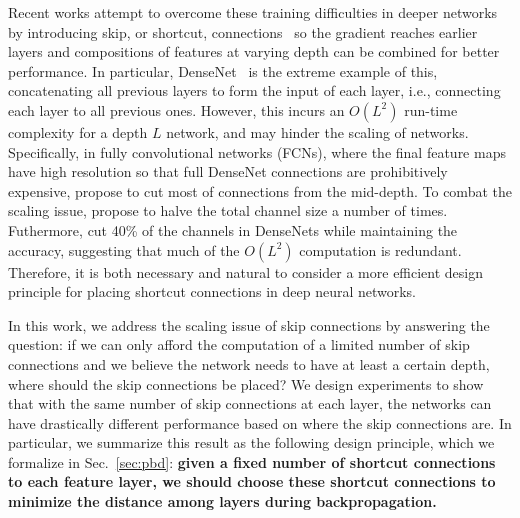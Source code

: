 \documentclass{article}
\begin{document}
Recent works attempt to overcome these training difficulties in deeper networks by introducing skip, or shortcut, connections~\citep{fcn, hypercolumn, highwaynet, resnet, fractalnet, densenet} so the gradient reaches earlier layers and compositions of features at varying depth can be combined for better performance. In particular, DenseNet~\citep{densenet} is the extreme example of this, concatenating all previous layers to form the input of each layer, i.e., connecting each layer to all previous ones. However, this incurs an $O(L^2)$ run-time complexity for a depth $L$ network, and may hinder the scaling of networks. Specifically, in fully convolutional networks (FCNs), where the final feature maps have high resolution so that full DenseNet connections are prohibitively expensive, \cite{fcdense} propose to cut most of connections from the mid-depth. To combat the scaling issue, \cite{densenet} propose to halve the total channel size a number of times. Futhermore, \cite{slim_nn} cut 40\% of the channels in DenseNets while maintaining the accuracy, suggesting that much of the $O(L^2)$ computation is redundant. Therefore, it is both necessary and natural to consider a more efficient design principle for placing shortcut connections in deep neural networks.


In this work, we address the scaling issue of skip connections by answering the question: if we can only afford the computation of a limited number of skip connections and we believe the network needs to have at least a certain depth, where should the skip connections be placed?
We design experiments to show that with the same number of skip connections at each layer, the networks can have drastically different performance based on where the skip connections are. In particular, we summarize this result as the following design principle, which we formalize in Sec.~\ref{sec:pbd}:
\textbf{given a fixed number of shortcut connections to each feature layer, we should choose these shortcut connections to minimize the distance among layers during backpropagation.}
\end{document}
